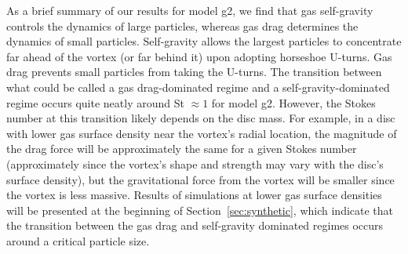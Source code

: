 \documentclass[a4paper,usenatbib]{mnras}
\begin{document}
As a brief summary of our results for model g2, we find that gas
self-gravity controls the dynamics of large particles, whereas gas
drag determines the dynamics of small particles.  Self-gravity allows
the largest particles to concentrate far ahead of the vortex (or far
behind it) upon adopting horseshoe U-turns. Gas drag prevents small
particles from taking the U-turns. The transition between what could
be called a gas drag-dominated regime and a self-gravity-dominated
regime occurs quite neatly around St $\approx 1$ for model
g2. However, the Stokes number at this transition likely depends on
the disc mass. For example, in a disc with lower gas surface density
near the vortex's radial location, the magnitude of the drag force
will be approximately the same for a given Stokes number
(approximately since the vortex's shape and strength may vary with the
disc's surface density), but the gravitational force from the vortex
will be smaller since the vortex is less massive. Results of
simulations at lower gas surface densities will be presented at the
beginning of Section~\ref{sec:synthetic}, which indicate that the
transition between the gas drag and self-gravity dominated regimes
occurs around a critical particle size.

\end{document}
